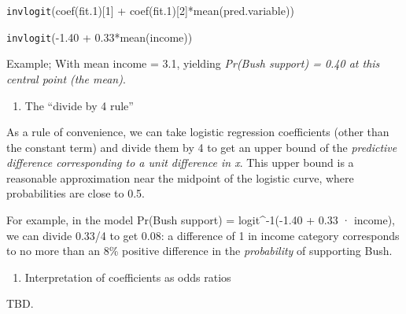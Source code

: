 \documentclass[
]{article}
\providecommand{\tightlist}{%
  \setlength{\itemsep}{0pt}\setlength{\parskip}{0pt}}
\begin{document}
\texttt{invlogit}(coef(fit.1){[}1{]} +
coef(fit.1){[}2{]}*mean(pred.variable))

\texttt{invlogit}(-1.40 + 0.33*mean(income))

Example; With mean income = 3.1, yielding \emph{Pr(Bush support) = 0.40
at this central point (the mean)}.

\begin{enumerate}
\def\labelenumi{\arabic{enumi}.}
\setcounter{enumi}{1}
\tightlist
\item
  The ``divide by 4 rule''
\end{enumerate}

As a rule of convenience, we can take logistic regression coefficients
(other than the constant term) and divide them by 4 to get an upper
bound of the \emph{predictive difference corresponding to a unit
difference in x}. This upper bound is a reasonable approximation near
the midpoint of the logistic curve, where probabilities are close to
0.5.

For example, in the model Pr(Bush support) = logit\^{}-1(-1.40 + 0.33 ·
income), we can divide 0.33/4 to get 0.08: a difference of 1 in income
category corresponds to no more than an 8\% positive difference in the
\emph{probability} of supporting Bush.

\begin{enumerate}
\def\labelenumi{\arabic{enumi}.}
\setcounter{enumi}{2}
\tightlist
\item
  Interpretation of coefficients as odds ratios
\end{enumerate}

TBD.
\end{document}
